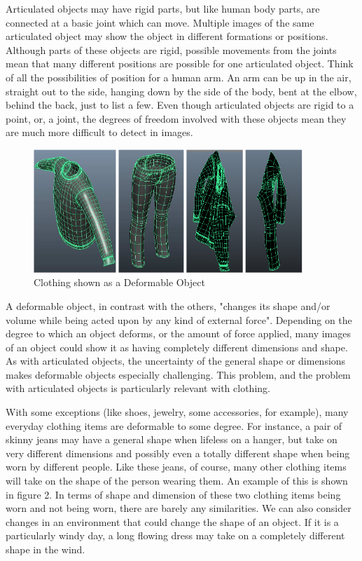 \documentclass[12pt]{report} %
\begin{document}
	Articulated objects may have rigid parts, but like human body parts, are connected at a basic joint which can move\cite{szeliski2010computer}. Multiple images of the same articulated object may show the object in different formations or positions. Although parts of these objects are rigid, possible movements from the joints mean that many different positions are possible for one articulated object. Think of all the possibilities of position for a human arm. An arm can be up in the air, straight out to the side, hanging down by the side of the body, bent at the elbow, behind the back, just to list a few. Even though articulated objects are rigid to a point, or, a joint, the degrees of freedom involved with these objects mean they are much more difficult to detect in images.
	
 \begin{figure}
\centering
\includegraphics[width=4in]{deformable} 
\caption{Clothing shown as a Deformable Object}
\end{figure}

	A deformable object, in contrast with the others, "changes its shape and/or volume while being acted upon by any kind of external force"\cite{wolfram}. Depending on the degree to which an object deforms, or the amount of force applied, many images of an object could show it as having completely different dimensions and shape. As with articulated objects, the uncertainty of the general shape or dimensions makes deformable objects especially challenging. This problem, and the problem with articulated objects is particularly relevant with clothing. 
	
	With some exceptions (like shoes, jewelry, some accessories, for example), many everyday clothing items are deformable to some degree. For instance, a pair of skinny jeans may have a general shape when lifeless on a hanger, but take on very different dimensions and possibly even a totally different shape when being worn by different people. Like these jeans, of course, many other clothing items will take on the shape of the person wearing them. An example of this is shown in figure 2.\cite{Li_ICRA2014} In terms of shape and dimension of these two clothing items being worn and not being worn, there are barely any similarities. We can also consider changes in an environment that could change the shape of an object. If it is a particularly windy day, a long flowing dress may take on a completely different shape in the wind.
\end{document}
